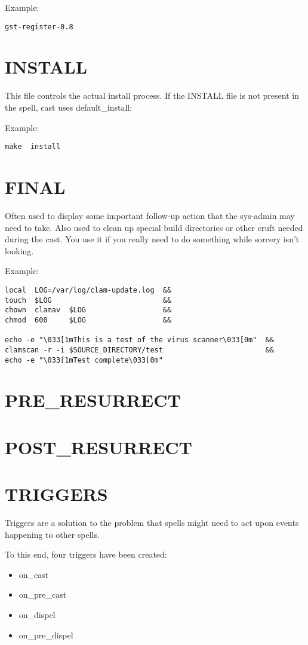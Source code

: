 \documentclass[a4paper,10pt]{book}
\begin{document}
Example:
\begin{verbatim}
gst-register-0.8
\end{verbatim}

\section{INSTALL}
This file controls the actual install process.  If the INSTALL file is not
present in the spell, cast uses default\_install:

Example:
\begin{verbatim}
make  install
\end{verbatim}


\section{FINAL}
Often used to display some important follow-up action that the sys-admin may
need to take. Also used to clean up special build directories or other cruft
needed during the cast. You use it if you really need to do something while
sorcery isn't looking.

Example:
\begin{verbatim}
local  LOG=/var/log/clam-update.log  &&
touch  $LOG                          &&
chown  clamav  $LOG                  &&
chmod  600     $LOG                  &&

echo -e "\033[1mThis is a test of the virus scanner\033[0m"  &&
clamscan -r -i $SOURCE_DIRECTORY/test                        &&
echo -e "\033[1mTest complete\033[0m"
\end{verbatim}

\section{PRE\_RESURRECT}
\section{POST\_RESURRECT}
\section{TRIGGERS}
Triggers are a solution to the problem that spells might need to act upon
events happening to other spells.

To this end, four triggers have been created:
\begin{itemize}
\item on\_cast
\item on\_pre\_cast
\item on\_dispel
\item on\_pre\_dispel
\end{itemize}
\end{document}

